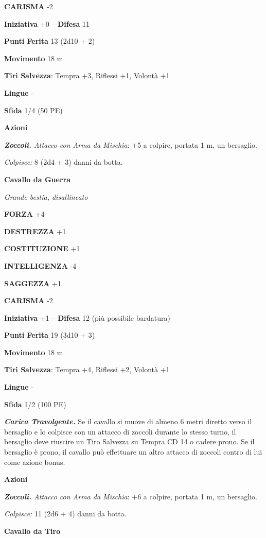 \begin{multicols}{2}
\textbf{CARISMA} -2

\textbf{Iniziativa} +0 -- \textbf{Difesa} 11

\textbf{Punti Ferita} 13 (2d10 + 2)

\textbf{Movimento} 18 m

\textbf{Tiri Salvezza}: Tempra +3, Riflessi +1, Volontà +1 

\textbf{Lingue} -

\textbf{Sfida} 1/4 (50 PE)

\textbf{Azioni}

\emph{\textbf{Zoccoli.} Attacco con Arma da Mischia}: +5 a colpire, portata 1 m, un bersaglio.

\emph{Colpisce:} 8 (2d4 + 3) danni da botta.

\medskip\textbf{Cavallo da Guerra}

\emph{Grande bestia, disallineato}

\textbf{FORZA} +4

\textbf{DESTREZZA} +1

\textbf{COSTITUZIONE} +1

\textbf{INTELLIGENZA} -4

\textbf{SAGGEZZA} +1

\textbf{CARISMA} -2

\textbf{Iniziativa} +1 -- \textbf{Difesa} 12 (più possibile bardatura)

\textbf{Punti Ferita} 19 (3d10 + 3)

\textbf{Movimento} 18 m

\textbf{Tiri Salvezza}:  Tempra +4, Riflessi +2, Volontà +1 

\textbf{Lingue} -

\textbf{Sfida} 1/2 (100 PE)

\emph{\textbf{Carica Travolgente.}} Se il cavallo si muove di almeno 6 metri diretto verso il bersaglio e lo colpisce con un attacco di zoccoli durante lo stesso turno, il bersaglio deve riuscire un Tiro Salvezza su Tempra CD 14 o cadere prono. Se il bersaglio è prono, il cavallo può effettuare un altro attacco di zoccoli contro di lui come azione bonus.

\textbf{Azioni}

\emph{\textbf{Zoccoli.} Attacco con Arma da Mischia}: +6 a colpire, portata 1 m, un bersaglio.

\emph{Colpisce:} 11 (2d6 + 4) danni da botta.

\medskip\textbf{Cavallo da Tiro}


\end{multicols}
